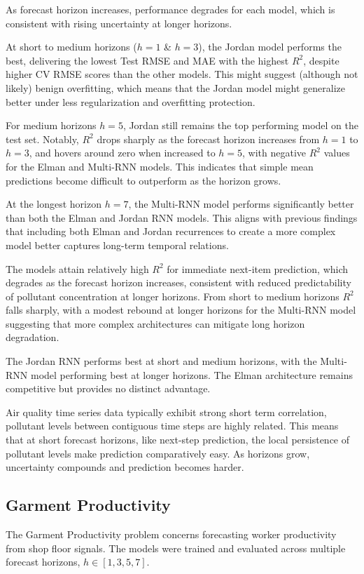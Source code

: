 \documentclass[conference]{IEEEtran}
\begin{document}
As forecast horizon increases, performance degrades for each model, which is consistent with rising uncertainty at longer horizons.

At short to medium horizons ($h=1$ \& $h=3$), the Jordan model performs the best, delivering the lowest Test RMSE and MAE with the highest $R^2$, despite higher CV RMSE scores than the other models. This might suggest (although not likely) benign overfitting, which means that the Jordan model might generalize better under less regularization and overfitting protection.

For medium horizons $h=5$, Jordan still remains the top performing model on the test set. Notably, $R^2$ drops sharply as the forecast horizon increases from $h=1$ to $h=3$, and hovers around zero when increased to $h=5$, with negative $R^2$ values for the Elman and Multi-RNN models. This indicates that simple mean predictions become difficult to outperform as the horizon grows.

At the longest horizon $h=7$, the Multi-RNN model performs significantly better than both the Elman and Jordan RNN models. This aligns with previous findings that including both Elman and Jordan recurrences to create a more complex model better captures long-term temporal relations.

The models attain relatively high $R^2$ for immediate next-item prediction, which degrades as the forecast horizon increases, consistent with reduced predictability of pollutant concentration at longer horizons. From short to medium  horizons $R^2$ falls sharply, with a modest rebound at longer horizons for the Multi-RNN model suggesting that more complex architectures can mitigate long horizon degradation.

The Jordan RNN performs best at short and medium horizons, with the Multi-RNN model performing best at longer horizons. The Elman architecture remains competitive but provides no distinct advantage.

Air quality time series data typically exhibit strong short term correlation, pollutant levels between contiguous time steps are highly related. This means that at short forecast horizons, like next-step prediction, the local persistence of pollutant levels make prediction comparatively easy. As horizons grow, uncertainty compounds and prediction becomes harder.

\subsection{\textbf{Garment Productivity}}
The Garment Productivity problem concerns forecasting worker productivity from shop floor signals. The models were trained and evaluated across multiple forecast horizons, $h \in [1,3,5,7]$.
\end{document}
